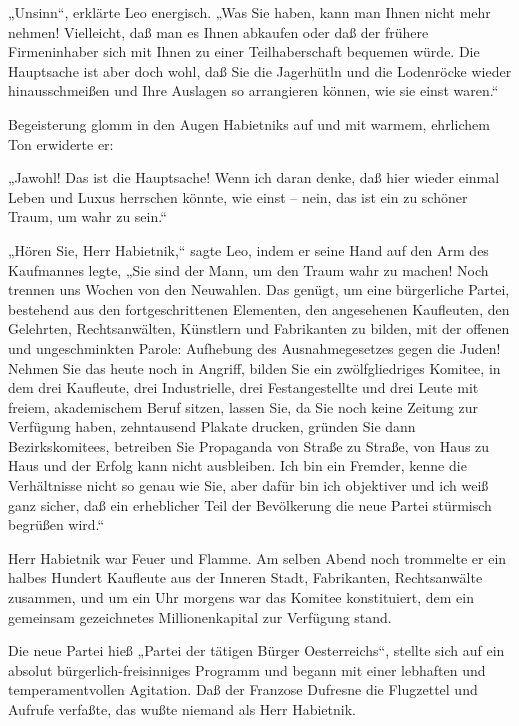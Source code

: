 „Unsinn“, erklärte Leo energisch. „Was Sie haben, kann man Ihnen
nicht mehr nehmen! Vielleicht, daß man es Ihnen abkaufen oder daß
der frühere Firmeninhaber sich mit Ihnen zu einer Teilhaberschaft
bequemen würde. Die Hauptsache ist aber doch wohl, daß Sie die
Jagerhütln und die Lodenröcke wieder hinausschmeißen und Ihre
Auslagen so arrangieren können, wie sie einst waren.“

Begeisterung glomm in den Augen Habietniks auf und mit warmem,
ehrlichem Ton erwiderte er:

„Jawohl! Das ist die Hauptsache! Wenn ich daran denke, daß hier
wieder einmal Leben und Luxus herrschen könnte, wie einst – nein,
das ist ein zu schöner Traum, um wahr zu sein.“

„Hören Sie, Herr Habietnik,“ sagte Leo, indem er seine Hand auf den
Arm des Kaufmannes legte, „Sie sind der Mann, um den Traum wahr zu
machen! Noch trennen uns Wochen von den Neuwahlen. Das genügt, um
eine bürgerliche Partei, bestehend aus den fortgeschrittenen
Elementen, den angesehenen Kaufleuten, den Gelehrten,
Rechtsanwälten, Künstlern und Fabrikanten zu bilden, mit der
offenen und ungeschminkten Parole: Aufhebung des Ausnahmegesetzes
gegen die Juden! Nehmen Sie das heute noch in Angriff, bilden Sie
ein zwölfgliedriges Komitee, in dem drei Kaufleute, drei
Industrielle, drei Festangestellte und drei Leute mit freiem,
akademischem Beruf sitzen, lassen Sie, da Sie noch keine Zeitung
zur Verfügung haben, zehntausend  Plakate drucken,
gründen Sie dann Bezirkskomitees, betreiben Sie Propaganda von
Straße zu Straße, von Haus zu Haus und der Erfolg kann nicht
ausbleiben. Ich bin ein Fremder, kenne die Verhältnisse nicht so
genau wie Sie, aber dafür bin ich objektiver und ich weiß ganz
sicher, daß ein erheblicher Teil der Bevölkerung die neue Partei
stürmisch begrüßen wird.“

Herr Habietnik war Feuer und Flamme. Am selben Abend noch trommelte
er ein halbes Hundert Kaufleute aus der Inneren Stadt, Fabrikanten,
Rechtsanwälte zusammen, und um ein Uhr morgens war das Komitee
konstituiert, dem ein gemeinsam gezeichnetes Millionenkapital zur
Verfügung stand.

Die neue Partei hieß „Partei der tätigen Bürger Oesterreichs“,
stellte sich auf ein absolut bürgerlich-freisinniges Programm und
begann mit einer lebhaften und temperamentvollen Agitation. Daß der
Franzose Dufresne die Flugzettel und Aufrufe verfaßte, das wußte
niemand als Herr Habietnik.

